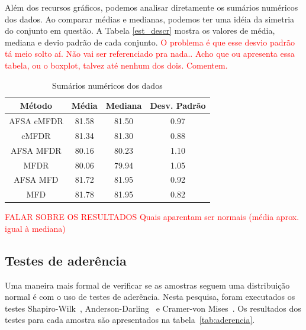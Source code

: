\documentclass[conference]{IEEEtran}
\begin{document}
Além dos recursos gráficos, podemos analisar diretamente os sumários numéricos dos dados.
Ao comparar médias e medianas, podemos ter uma idéia da simetria do conjunto em questão.
A Tabela \ref{est_descr} mostra os valores de média, mediana e devio padrão de cada conjunto.
\textcolor{red} {O problema é que esse desvio padrão tá meio solto aí. Não vai ser referenciado pra nada.. Acho que ou apresenta essa tabela, ou o boxplot, talvez até nenhum dos dois. Comentem.}
\begin{table}[h]
	\centering
	\caption{Sumários numéricos dos dados}
	\label{tab:est_descr}
	\begin{tabular}{c|ccc}
		Método    	& Média  	& Mediana 	& Desv. Padrão  \\
		\hline
		AFSA cMFDR 	& 81.58 	& 81.50 	& 0.97 \\
		cMFDR 		& 81.34 	& 81.30		& 0.88 \\
		AFSA MFDR 	& 80.16 	& 80.23 	& 1.10 \\
		MFDR 		& 80.06 	& 79.94 	& 1.05 \\
		AFSA MFD 	& 81.72 	& 81.95 	& 0.92 \\
		MFD 		& 81.78 	& 81.95 	& 0.82 \\
		\hline
	\end{tabular}
\end{table}

\textcolor{red}{FALAR SOBRE OS RESULTADOS
Quais aparentam ser normais (média aprox. igual à mediana)
}


\subsection{Testes de aderência}

Uma maneira mais formal de verificar se as amostras seguem uma distribuição normal é com o uso de testes de aderência.
Nesta pesquisa, foram executados os testes Shapiro-Wilk~\cite{shapiro1965analysis}, Anderson-Darling~\cite{anderson1954test} e Cramer-von Mises~\cite{durbin1972components}.
Os resultados dos testes para cada amostra são apresentados na tabela~\ref{tab:aderencia}.
\end{document}
